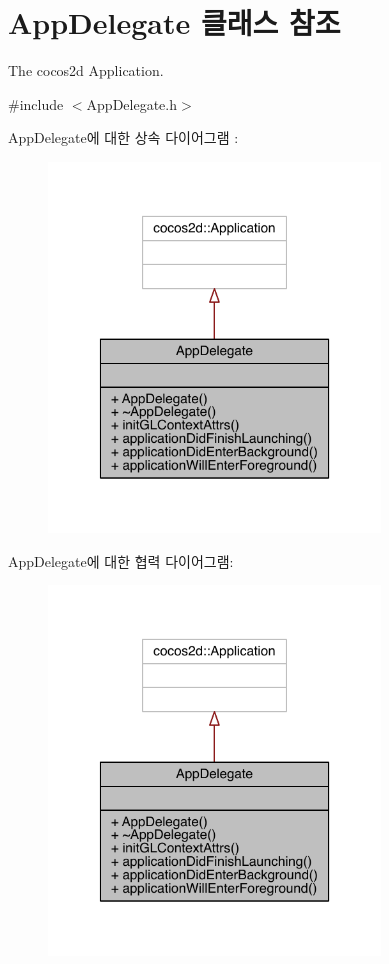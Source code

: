 \hypertarget{class_app_delegate}{}\section{App\+Delegate 클래스 참조}
\label{class_app_delegate}


The cocos2d Application.  




{\ttfamily \#include $<$App\+Delegate.\+h$>$}



App\+Delegate에 대한 상속 다이어그램 \+: 
\nopagebreak
\begin{figure}[H]
\begin{center}
\leavevmode
\includegraphics[width=250pt]{class_app_delegate__inherit__graph}
\end{center}
\end{figure}


App\+Delegate에 대한 협력 다이어그램\+:
\nopagebreak
\begin{figure}[H]
\begin{center}
\leavevmode
\includegraphics[width=250pt]{class_app_delegate__coll__graph}
\end{center}
\end{figure}
